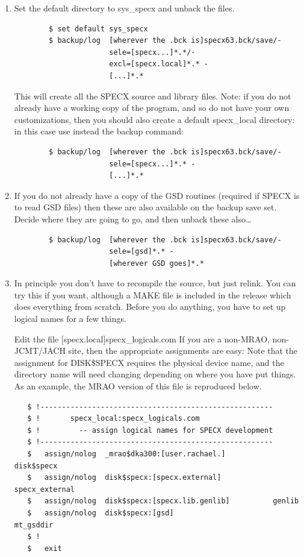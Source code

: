 \documentclass[11pt,twoside]{report}
\begin{document}
\begin{enumerate}
\item Set the default directory to sys\_specx and unback the files.

\begin{verbatim}
        $ set default sys_specx
        $ backup/log  [wherever the .bck is]specx63.bck/save/-
                      sele=[specx...]*.*/-
                      excl=[specx.local]*.* -
                      [...]*.*
\end{verbatim}

This will create all the SPECX source and library files.
Note: if you do not already have a working copy of the program, and
so do not have your own customizations, then
you should also create a default specx\_local directory: in this
case use instead the backup command:

\begin{verbatim}
        $ backup/log  [wherever the .bck is]specx63.bck/save/-
                      sele=[specx...]*.* -
                      [...]*.*
\end{verbatim}

\item If you do not already have a copy of the GSD routines (required
if SPECX is to read GSD files) then these are also available on
the backup save set. Decide where they are going to go, and then
unback these also\ldots

\begin{verbatim}
        $ backup/log  [wherever the .bck is]specx63.bck/save/-
                      sele=[gsd]*.* -
                      [wherever GSD goes]*.*
\end{verbatim}

\item In principle you don't have to recompile the source, but just
relink. You can try this if you want, although a MAKE file is
included in the release which does everything from scratch. Before
you do anything, you have to set up logical names for a few things.

Edit the file [specx.local]specx\_logicals.com If you are a non-MRAO,
non-JCMT/JACH site, then the appropriate assignments are easy: Note that the
assignment for DISK\$SPECX requires the physical device name, and the directory
name will need changing depending on where you have put things. As an example,
the MRAO version of this file is reproduced below.

\begin{verbatim}
   $ !------------------------------------------------------
   $ !       specx_local:specx_logicals.com
   $ !         -- assign logical names for SPECX development
   $ !------------------------------------------------------
   $   assign/nolog  _mrao$dka300:[user.rachael.]           disk$specx
   $   assign/nolog  disk$specx:[specx.external]            specx_external
   $   assign/nolog  disk$specx:[specx.lib.genlib]          genlib
   $   assign/nolog  disk$specx:[gsd]                       mt_gsddir
   $ !
   $   exit
\end{verbatim}


\end{enumerate}
\end{document}
